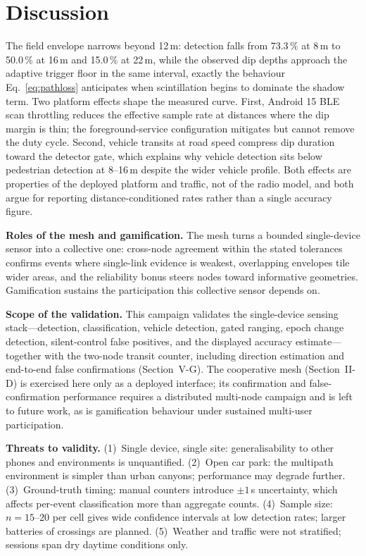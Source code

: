 \documentclass[journal,10pt]{IEEEtran}
\begin{document}
\section{Discussion}
The field envelope narrows beyond 12\,m: detection falls from 73.3\,\% at 8\,m to 50.0\,\% at 16\,m and
15.0\,\% at 22\,m, while the observed dip depths approach the adaptive trigger
floor in the same interval, exactly the behaviour Eq.~\eqref{eq:pathloss} anticipates when
scintillation begins to dominate the shadow term. Two platform effects shape
the measured curve. First, Android 15 BLE scan throttling reduces the
effective sample rate at distances where the dip margin is thin; the
foreground-service configuration mitigates but cannot remove the duty cycle.
Second, vehicle transits at road speed compress dip duration toward the
detector gate, which explains why vehicle detection sits below pedestrian
detection at 8--16\,m despite the wider vehicle profile. Both effects are
properties of the deployed platform and traffic, not of the radio model, and
both argue for reporting distance-conditioned rates rather than a single
accuracy figure.

\textbf{Roles of the mesh and gamification.} The mesh turns a bounded
single-device sensor into a collective one: cross-node agreement within the
stated tolerances confirms events where single-link evidence is weakest,
overlapping envelopes tile wider areas, and the reliability bonus steers
nodes toward informative geometries. Gamification sustains the participation
this collective sensor depends on.

\textbf{Scope of the validation.} This campaign validates the single-device
sensing stack---detection, classification, vehicle detection, gated ranging, epoch
change detection, silent-control false positives, and the displayed accuracy
estimate---together with the two-node transit counter, including direction
estimation and end-to-end false confirmations (Section~V-G). The cooperative
mesh (Section~II-D) is exercised here only as a deployed interface; its
confirmation and false-confirmation performance requires a distributed
multi-node campaign and is left to future work, as is gamification behaviour
under sustained multi-user participation.

\textbf{Threats to validity.} (1)~Single device, single site:
generalisability to other phones and environments is unquantified.
(2)~Open car park: the multipath environment is simpler than urban canyons;
performance may degrade further. (3)~Ground-truth timing: manual counters
introduce $\pm1$\,s uncertainty, which affects per-event classification more than
aggregate counts. (4)~Sample size: $n = 15$--$20$ per cell gives wide
confidence intervals at low detection rates; larger batteries of crossings
are planned. (5)~Weather and traffic were not stratified; sessions span dry
daytime conditions only.
\end{document}
